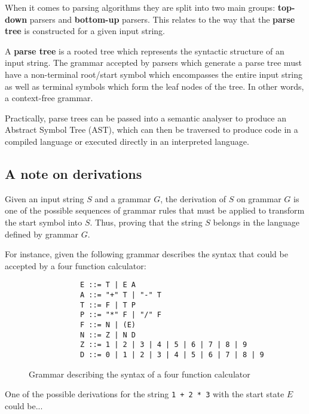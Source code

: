 When it comes to parsing algorithms they are split into two main groups: \textbf{top-down} parsers and \textbf{bottom-up} parsers. This relates to the way that the \textbf{parse tree} is constructed for a given input string.

A \textbf{parse tree} is a rooted tree which represents the syntactic structure of an input string. The grammar accepted by parsers which generate a parse tree must have a non-terminal root/start symbol which encompasses the entire input string as well as terminal symbols which form the leaf nodes of the tree. In other words, a context-free grammar.

Practically, parse trees can be passed into a semantic analyser to produce an Abstract Symbol Tree (AST), which can then be traversed to produce code in a compiled language or executed directly in an interpreted language.

\subsection{A note on derivations}

Given an input string $S$ and a grammar $G$, the derivation of $S$ on grammar $G$ is one of the possible sequences of grammar rules that must be applied to transform the start symbol into $S$. Thus, proving that the string $S$ belongs in the language defined by grammar $G$.

For instance, given the following grammar describes the syntax that could be accepted by a four function calculator:

\begin{figure}[h]
    \begin{center}
        \begin{verbatim}
            E ::= T | E A
            A ::= "+" T | "-" T
            T ::= F | T P
            P ::= "*" F | "/" F
            F ::= N | (E)
            N ::= Z | N D
            Z ::= 1 | 2 | 3 | 4 | 5 | 6 | 7 | 8 | 9
            D ::= 0 | 1 | 2 | 3 | 4 | 5 | 6 | 7 | 8 | 9
        \end{verbatim}
    \end{center}
    \vspace{-1.5em}
    \caption{\label{fig:3.3}Grammar describing the syntax of a four function calculator}
\end{figure}

\pagebreak

One of the possible derivations for the string \verb|1 + 2 * 3| with the start state $E$ could be...

